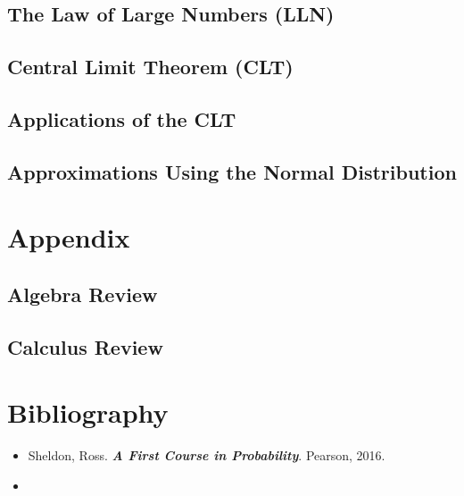 \documentclass[
  12pt,
]{krantzNoCorner}
\providecommand{\tightlist}{%
  \setlength{\itemsep}{0pt}\setlength{\parskip}{0pt}}
\begin{document}
\hypertarget{the-law-of-large-numbers-lln}{%
\section{The Law of Large Numbers (LLN)}\label{the-law-of-large-numbers-lln}}

\hypertarget{central-limit-theorem-clt}{%
\section{Central Limit Theorem (CLT)}\label{central-limit-theorem-clt}}

\hypertarget{applications-of-the-clt}{%
\section{Applications of the CLT}\label{applications-of-the-clt}}

\hypertarget{approximations-using-the-normal-distribution}{%
\section{Approximations Using the Normal Distribution}\label{approximations-using-the-normal-distribution}}

\hypertarget{appendix}{%
\chapter*{Appendix}\label{appendix}}


\hypertarget{algebra-review}{%
\section*{Algebra Review}\label{algebra-review}}


\hypertarget{calculus-review}{%
\section*{Calculus Review}\label{calculus-review}}


\hypertarget{bibliography}{%
\chapter*{Bibliography}\label{bibliography}}


\begin{itemize}
\tightlist
\item
  Sheldon, Ross. \textbf{\emph{A First Course in Probability}}. Pearson, 2016.
\item
\end{itemize}
\end{document}
